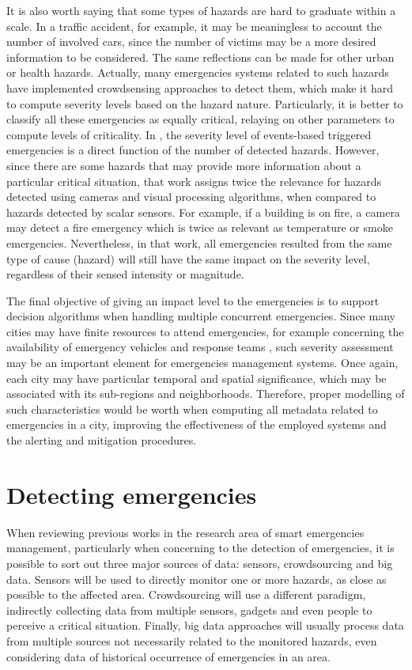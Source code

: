\begin{refsection}
It is also worth saying that some types of hazards are hard to graduate within a scale. In a traffic accident, for example, it may be meaningless to account the number of involved cars, since the number of victims may be a more desired information to be considered. The same reflections can be made for other urban or health hazards. Actually, many emergencies systems related to such hazards have implemented crowdsensing approaches to detect them, which make it hard to compute severity levels based on the hazard nature. Particularly, it is better to classify all these emergencies as equally critical, relaying on other parameters to compute levels of criticality. In \cite{emergenciesmetric3}, the severity level of events-based triggered emergencies is a direct function of the number of detected hazards. However, since there are some hazards that may provide more information about a particular critical situation, that work assigns twice the relevance for hazards detected using cameras and visual processing algorithms, when compared to hazards detected by scalar sensors. For example, if a building is on fire, a camera may detect a fire emergency which is twice as relevant as temperature or smoke emergencies. Nevertheless, in that work, all emergencies resulted from the same type of cause (hazard) will still have the same impact on the severity level, regardless of their sensed intensity or magnitude. 

The final objective of giving an impact level to the emergencies is to support decision algorithms when handling multiple concurrent emergencies. Since many cities may have finite resources to attend emergencies, for example concerning the availability of emergency vehicles and response teams \cite{costa2020automatic,tsunami1}, such severity assessment may be an important element for emergencies management systems. Once again, each city may have particular temporal and spatial significance, which may be associated with its sub-regions and neighborhoods. Therefore, proper modelling of such characteristics would be worth when computing all metadata related to emergencies in a city, improving the effectiveness of the employed systems and the alerting and mitigation procedures.

\section{Detecting emergencies}\label{sec4}

When reviewing previous works in the research area of smart emergencies management, particularly when concerning to the detection of emergencies, it is possible to sort out three major sources of data: sensors, crowdsourcing and big data. Sensors will be used to directly monitor one or more hazards, as close as possible to the affected area. Crowdsourcing will use a different paradigm, indirectly collecting data from multiple sensors, gadgets and even people to perceive a critical situation. Finally, big data approaches will usually process data from multiple sources not necessarily related to the monitored hazards, even considering data of historical occurrence of emergencies in an area. 


\end{refsection}
